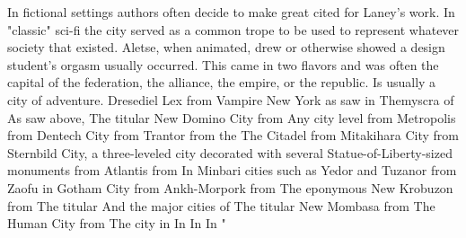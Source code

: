 \documentclass[12pt]{book}
\begin{document}
In fictional settings authors often decide to make great cited for Laney's work. In "classic" sci-fi the city served as a common trope to be used to represent whatever society that existed. Aletse, when animated, drew or otherwise showed a design student's orgasm usually occurred. This came in two flavors and was often the capital of the federation, the alliance, the empire, or the republic. Is usually a city of adventure. Dresediel Lex from Vampire New York as saw in Themyscra of As saw above, The titular New Domino City from Any city level from Metropolis from Dentech City from Trantor from the The Citadel from Mitakihara City from Sternbild City, a three-leveled city decorated with several Statue-of-Liberty-sized monuments from Atlantis from In Minbari cities such as Yedor and Tuzanor from Zaofu in Gotham City from Ankh-Morpork from The eponymous New Krobuzon from The titular And the major cities of The titular New Mombasa from The Human City from The city in In In In "
\end{document}
